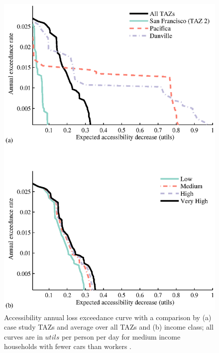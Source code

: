 \begin{figure}
\centering
\includegraphics[width=5in]{FIGS/equity_acc_loss_curves.eps} 
\caption{Accessibility annual loss exceedance curve with a comparison by (a) case study TAZs and average over all TAZs and (b) income class; all curves are in $utils$ per person per day for medium income households with fewer cars than workers .}
\label{fig:acc_by_TAZ_and_income}
\end{figure}
